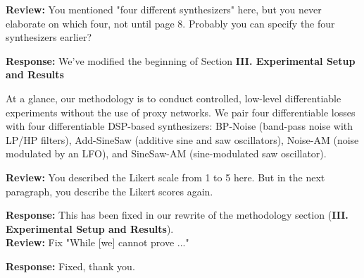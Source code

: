 \documentclass[11pt]{article}
\begin{document}
\noindent\textbf{Review:}
You mentioned "four different synthesizers" here, but you never elaborate on which four, not until page 8. Probably you can specify the four synthesizers earlier?

\noindent\textbf{Response:}
We've modified the beginning of Section \textbf{III. Experimental Setup and Results}

\begin{displayquote}
    At a glance, our methodology is to conduct controlled, low-level differentiable experiments without the use of proxy networks. We pair four differentiable losses with four differentiable DSP-based synthesizers: BP-Noise (band-pass noise with LP/HP filters), Add-SineSaw (additive sine and saw oscillators), Noise-AM (noise modulated by an LFO), and SineSaw-AM (sine-modulated saw oscillator). 
\end{displayquote}

\noindent\textbf{Review:}
You described the Likert scale from 1 to 5 here. But in the next paragraph, you describe the Likert scores again. 

\noindent\textbf{Response:}
This has been fixed in our rewrite of the methodology section (\textbf{III. Experimental Setup and Results}).
\\

\noindent\textbf{Review:}
Fix "While [we] cannot prove ..."

\noindent\textbf{Response:}
Fixed, thank you.
\\



\end{document}
